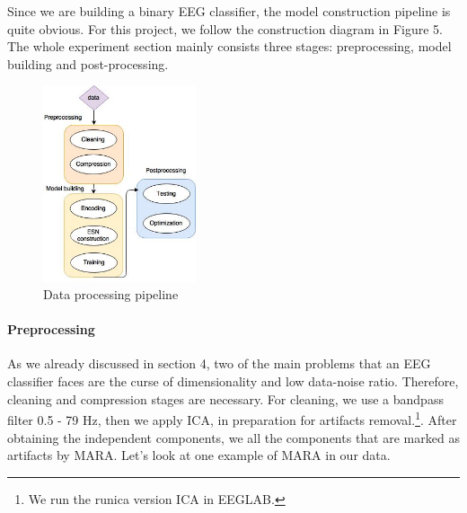\documentclass[a4paper,11pt,oneside]{article}
\begin{document}
Since we are building a binary EEG classifier, the model construction pipeline is quite obvious. For this project, we follow the construction diagram in Figure 5. The whole experiment section mainly consists three stages: preprocessing, model building and post-processing.

\begin{figure}
	\begin{center}
		\includegraphics[width=0.40\textwidth]{img/dataflow}
	\end{center}
	\caption{Data processing pipeline}
\end{figure}

	\paragraph{Preprocessing} As we already discussed in section 4, two of the main problems that an EEG classifier faces are the curse of dimensionality and low data-noise ratio. Therefore, cleaning and compression stages are necessary. For cleaning, we use a bandpass filter 0.5 - 79 Hz, then we apply ICA, in preparation for artifacts removal.\footnote{We run the runica version ICA in EEGLAB.}. After obtaining the independent components, we all the components that are marked as artifacts by MARA. Let's look at one example of MARA in our data. 
		
\end{document}
